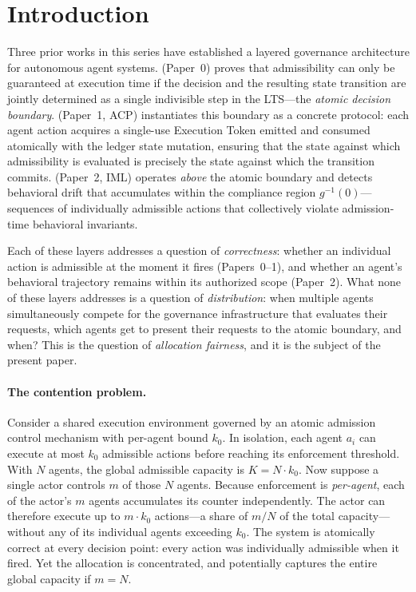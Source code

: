 \documentclass[11pt]{article}
\theoremstyle{plain}
\theoremstyle{definition}
\theoremstyle{remark}
\newcommand{\kbound}{k_0}                  %
\newcommand{\Kcap}{K}                      %
\begin{document}
\tableofcontents
\newpage

\section{Introduction}
\label{sec:intro}

Three prior works in this series have established a layered governance
architecture for autonomous agent systems.  \citet{fernandez2026a}
(Paper~0) proves that admissibility can only be guaranteed at execution
time if the decision and the resulting state transition are jointly
determined as a single indivisible step in the LTS---the
\emph{atomic decision boundary}.  \citet{fernandez2026b}
(Paper~1, ACP) instantiates this boundary as a concrete protocol:
each agent action acquires a single-use Execution Token emitted and
consumed atomically with the ledger state mutation, ensuring that the
state against which admissibility is evaluated is precisely the state
against which the transition commits.  \citet{fernandez2026c}
(Paper~2, IML) operates \emph{above} the atomic boundary and detects
behavioral drift that accumulates within the compliance region
$g^{-1}(0)$---sequences of individually admissible actions that
collectively violate admission-time behavioral invariants.

Each of these layers addresses a question of \emph{correctness}: whether
an individual action is admissible at the moment it fires (Papers~0--1),
and whether an agent's behavioral trajectory remains within its
authorized scope (Paper~2).  What none of these layers addresses is a
question of \emph{distribution}: when multiple agents simultaneously
compete for the governance infrastructure that evaluates their requests,
which agents get to present their requests to the atomic boundary, and
when?  This is the question of \emph{allocation fairness}, and it is the
subject of the present paper.

\paragraph{The contention problem.}
Consider a shared execution environment governed by an atomic admission
control mechanism with per-agent bound $\kbound$.  In isolation, each
agent $a_i$ can execute at most $\kbound$ admissible actions before
reaching its enforcement threshold.  With $N$ agents, the global
admissible capacity is $\Kcap = N \cdot \kbound$.  Now suppose a single
actor controls $m$ of those $N$ agents.  Because enforcement is
\emph{per-agent}, each of the actor's $m$ agents accumulates its counter
independently.  The actor can therefore execute up to $m \cdot \kbound$
actions---a share of $m/N$ of the total capacity---without any of its
individual agents exceeding $\kbound$.  The system is atomically correct
at every decision point: every action was individually admissible when it
fired.  Yet the allocation is concentrated, and potentially captures the
entire global capacity if $m = N$.
\end{document}
